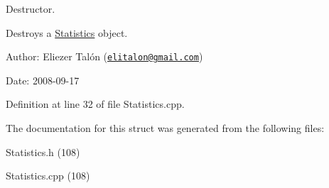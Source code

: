 Destructor. 

Destroys a \hyperlink{struct_statistics}{Statistics} object.

\begin{Desc}
\item[Author:]Eliezer Talón (\href{mailto:elitalon@gmail.com}{\tt elitalon@gmail.com}) \end{Desc}
\begin{Desc}
\item[Date:]2008-09-17 \end{Desc}


Definition at line 32 of file Statistics.cpp.

The documentation for this struct was generated from the following files:\begin{CompactItemize}
\item 
Statistics.h (108)\item 
Statistics.cpp (108)\end{CompactItemize}
